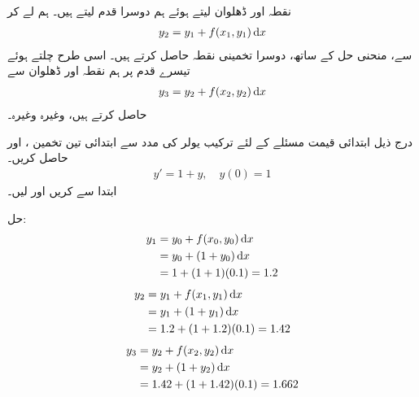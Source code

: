 نقطہ  اور ڈھلوان  لیتے ہوئے ہم دوسرا قدم لیتے ہیں۔ ہم  لے کر 
\begin{align*}
y_2=y_1+f(x_1,y_1)\dif x
\end{align*}
سے، منحنی حل  کے ساتھ، دوسرا تخمینی نقطہ  حاصل کرتے ہیں۔ اسی طرح چلتے ہوئے تیسرے قدم پر  ہم نقطہ  اور ڈھلوان  سے
\begin{align*}
y_3=y_2+f(x_2,y_2)\dif x
\end{align*}
حاصل کرتے ہیں، وغیرہ وغیرہ۔

درج ذیل ابتدائی قیمت مسئلے کے لئے ترکیب یولر کی مدد سے  ابتدائی تین تخمین ،  اور   حاصل کریں۔
\begin{align*}
y'=1+y,\quad y(0)=1
\end{align*}
ابتدا  سے کریں اور  لیں۔

حل:\quad
{}
\begin{align*}
y_1&=y_0+f(x_0,y_0)\dif x\\
&=y_0+(1+y_0)\dif x\\
&=1+(1+1)(0.1)=1.2
\end{align*}
\begin{align*}
y_2&=y_1+f(x_1,y_1)\dif x\\
&=y_1+(1+y_1)\dif x\\
&=1.2+(1+1.2)(0.1)=1.42
\end{align*}
\begin{align*}
y_3&=y_2+f(x_2,y_2)\dif x\\
&=y_2+(1+y_2)\dif x\\
&=1.42+(1+1.42)(0.1)=1.662
\end{align*}

